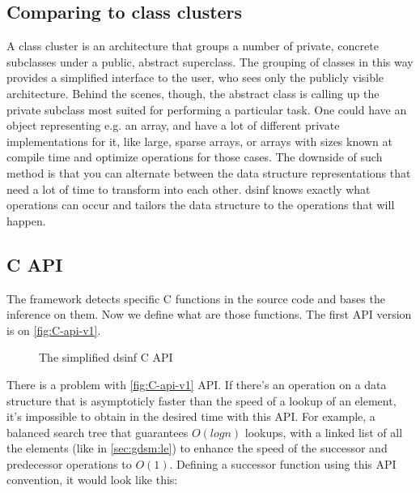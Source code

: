 \documentclass[a4paper,11pt]{article}
\begin{document}
	\subsection{Comparing to class clusters} \label{sub:classcluster}
		A class cluster is an architecture that groups a number of private, concrete subclasses under a public,
		abstract superclass. The grouping of classes in this way provides a simplified interface to the user,
		who sees only the publicly visible architecture. Behind the scenes, though, the abstract class is
		calling up the private subclass most suited for performing a particular task\cite{AppleCC}. One could
		have an object representing e.g. an array, and have a lot of different private implementations for it, like
		large, sparse arrays, or arrays with sizes known at compile time and optimize operations for those
		cases. The downside of such method is that you can alternate between the data structure representations
		that need a lot of time to transform into each other. dsinf knows exactly what operations can occur and
		tailors the data structure to the operations that will happen.

	\subsection{C API}
        The framework detects specific C functions in the source code and bases the inference on them. Now we define
        what are those functions. The first API version is on \autoref{fig:C-api-v1}.

        \begin{figure}[h!]
            

            \caption{The simplified dsinf C API}

            \label{fig:C-api-v1}
        \end{figure}

        There is a problem with \autoref{fig:C-api-v1} API. If there's an
        operation on a data structure that is asymptoticly faster than the
        speed of a lookup of an element, it's impossible to obtain in the
        desired time with this API. For example, a balanced search tree
        that guarantees $O(log n)$ lookups, with a linked list of all the
        elements (like in \autoref{sec:gdsm:le}) to enhance the speed of the
        successor and predecessor operations to $O(1)$. Defining a successor
        function using this API convention, it would look like this:
\end{document}
